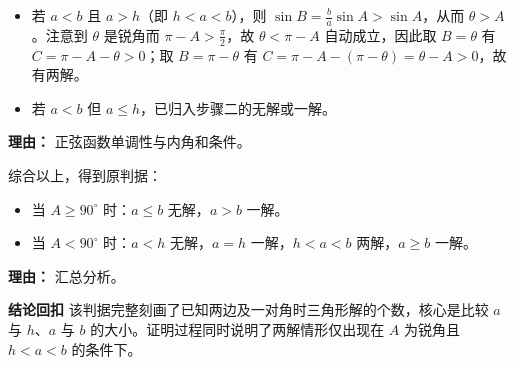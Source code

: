 \begin{proofbox}
\begin{description}[style=nextline, leftmargin=2.8em, labelsep=0.5em, itemsep=0.55em]
\begin{itemize}
			\item 若 $a<b$ 且 $a>h$（即 $h<a<b$），则 $\sin B = \frac{b}{a}\sin A > \sin A$，从而 $\theta > A$。注意到 $\theta$ 是锐角而 $\pi-A > \frac{\pi}{2}$，故 $\theta < \pi-A$ 自动成立，因此取 $B=\theta$ 有 $C = \pi-A-\theta >0$；取 $B = \pi-\theta$ 有 $C = \pi-A-(\pi-\theta) = \theta-A >0$，故有两解。
			\item 若 $a<b$ 但 $a\leq h$，已归入步骤二的无解或一解。
		\end{itemize}
			\par\textbf{理由：} 正弦函数单调性与内角和条件。
		\item[\textbf{步骤五（整合）：}]
			综合以上，得到原判据：
			\begin{itemize}
			\item 当 $A\geq90^\circ$ 时：$a\leq b$ 无解，$a>b$ 一解。
			\item 当 $A<90^\circ$ 时：$a<h$ 无解，$a=h$ 一解，$h<a<b$ 两解，$a\geq b$ 一解。
		\end{itemize}
			\par\textbf{理由：} 汇总分析。
	\end{description}

	\medskip
	\textbf{\textcolor{CProof}{结论回扣}}
	该判据完整刻画了已知两边及一对角时三角形解的个数，核心是比较 $a$ 与 $h$、$a$ 与 $b$ 的大小。证明过程同时说明了两解情形仅出现在 $A$ 为锐角且 $h<a<b$ 的条件下。
\end{proofbox}
